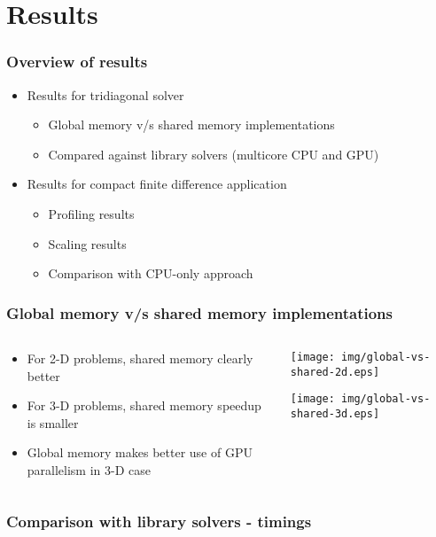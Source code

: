 \section{Results}

\begin{frame}
\frametitle{Overview of results}
\begin{itemize}
\item Results for tridiagonal solver
\begin{itemize}
    \item Global memory v/s shared memory implementations
    \item Compared against library solvers
        (multicore CPU and GPU)
\end{itemize}
\item Results for compact finite difference application
\begin{itemize}
    \item Profiling results
    \item Scaling results
    \item Comparison with CPU-only approach
\end{itemize}
\end{itemize}
\end{frame}


\begin{frame}
\frametitle{Global memory v/s shared memory implementations}
\begin{columns}
\begin{column}{0.5\textwidth}
\begin{itemize}
\item For 2-D problems, shared memory clearly better
\item For 3-D problems, shared memory speedup
    is smaller
\item Global memory makes better use of
    GPU parallelism in 3-D case
\end{itemize}
\end{column}
\begin{column}{0.5\textwidth}
\centering
\texttt{[image: img/global-vs-shared-2d.eps]}

\texttt{[image: img/global-vs-shared-3d.eps]}
\end{column}
\end{columns}
\end{frame}

\begin{frame}
\frametitle{Comparison with library solvers - timings}
\begin{table}
\resizebox{\textwidth}{!}{%

}
\end{table}
\end{frame}

